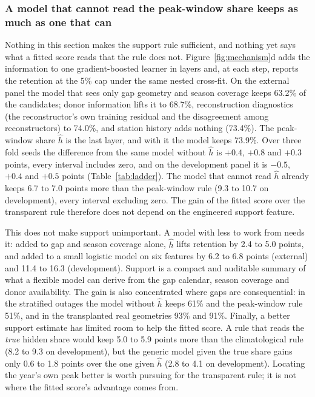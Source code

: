 \documentclass[draft]{agujournal2025}
\begin{document}
\subsubsection{A model that cannot read the peak-window share keeps as much as one that can}

Nothing in this section makes the support rule sufficient, and nothing yet says
what a fitted score reads that the rule does not. Figure~\ref{fig:mechanism}d adds
the information to one gradient-boosted learner in layers and, at each step,
reports the retention at the 5\% cap under the same nested cross-fit. On the
external panel the model that sees only gap geometry and season coverage keeps
63.2\% of the candidates; donor information lifts it to 68.7\%, reconstruction
diagnostics (the reconstructor's own training residual and the disagreement
among reconstructors) to 74.0\%, and station history adds nothing (73.4\%). The
peak-window share $\hat h$ is the last layer, and with it the model keeps 73.9\%.
Over three fold seeds the difference from the same model without $\hat h$ is
$+0.4$, $+0.8$ and $+0.3$ points, every interval includes zero, and on the
development panel it is $-0.5$, $+0.4$ and $+0.5$ points (Table~\ref{tab:ladder}).
The model that cannot read $\hat h$ already keeps 6.7 to 7.0 points more than the
peak-window rule (9.3 to 10.7 on development), every interval excluding zero. The
gain of the fitted score over the transparent rule therefore does not depend on
the engineered support feature.

This does not make support unimportant. A model with less to work from needs it:
added to gap and season coverage alone, $\hat h$ lifts retention by 2.4 to 5.0
points, and added to a small logistic model on six features by 6.2 to 6.8 points
(external) and 11.4 to 16.3 (development). Support is a compact and auditable
summary of what a flexible model can derive from the gap calendar, season
coverage and donor availability. The gain is also concentrated where gaps are
consequential: in the stratified outages the model without $\hat h$ keeps 61\% and
the peak-window rule 51\%, and in the transplanted real geometries 93\% and 91\%.
Finally, a better support estimate has limited room to help the fitted score. A
rule that reads the \emph{true} hidden share would keep 5.0 to 5.9 points more
than the climatological rule (8.2 to 9.3 on development), but the generic model
given the true share gains only 0.6 to 1.8 points over the one given $\hat h$
(2.8 to 4.1 on development). Locating the year's own peak better is worth
pursuing for the transparent rule; it is not where the fitted score's advantage
comes from.
\end{document}
